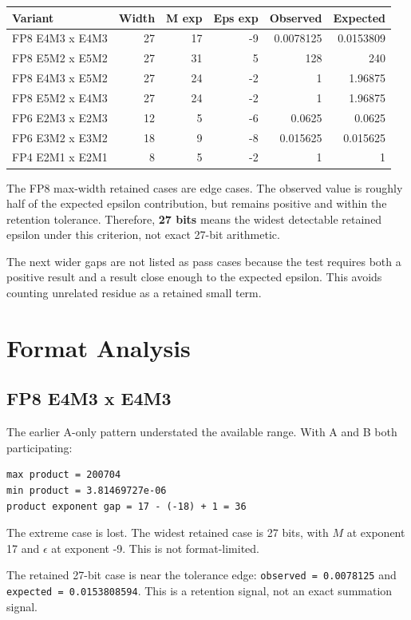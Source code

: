 \documentclass[11pt]{article}
\begin{document}
\begin{tabularx}{\linewidth}{Y R R R R R}
\toprule
Variant & Width & M exp & Eps exp & Observed & Expected \\
\midrule
FP8 E4M3 x E4M3 & 27 & 17 & -9 & 0.0078125 & 0.0153809 \\
FP8 E5M2 x E5M2 & 27 & 31 & 5 & 128 & 240 \\
FP8 E4M3 x E5M2 & 27 & 24 & -2 & 1 & 1.96875 \\
FP8 E5M2 x E4M3 & 27 & 24 & -2 & 1 & 1.96875 \\
FP6 E2M3 x E2M3 & 12 & 5 & -6 & 0.0625 & 0.0625 \\
FP6 E3M2 x E3M2 & 18 & 9 & -8 & 0.015625 & 0.015625 \\
FP4 E2M1 x E2M1 & 8 & 5 & -2 & 1 & 1 \\
\bottomrule
\end{tabularx}

The FP8 max-width retained cases are edge cases. The observed value is roughly
half of the expected epsilon contribution, but remains positive and within the
retention tolerance. Therefore, \textbf{27 bits} means the widest detectable
retained epsilon under this criterion, not exact 27-bit arithmetic.

The next wider gaps are not listed as pass cases because the test requires both
a positive result and a result close enough to the expected epsilon. This avoids
counting unrelated residue as a retained small term.

\section{Format Analysis}

\subsection{FP8 E4M3 x E4M3}

The earlier A-only pattern understated the available range. With A and B both
participating:

\begin{lstlisting}
max product = 200704
min product = 3.81469727e-06
product exponent gap = 17 - (-18) + 1 = 36
\end{lstlisting}

The extreme case is lost. The widest retained case is 27 bits, with
\(M\) at exponent 17 and \(\epsilon\) at exponent -9. This is not
format-limited.

The retained 27-bit case is near the tolerance edge:
\texttt{observed = 0.0078125} and
\texttt{expected = 0.0153808594}. This is a retention signal, not an exact
summation signal.
\end{document}
